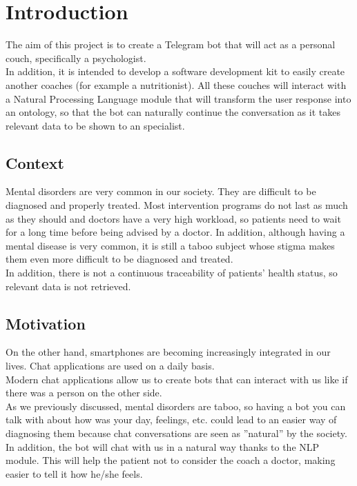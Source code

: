 \documentclass[12pt,english]{article}
\begin{document}


\thispagestyle{empty}
\newpage
\tableofcontents{}
\newpage
\listoffigures
\thispagestyle{empty}
\newpage

\section{Introduction}

The aim of this project is to create a Telegram bot that will act as a personal couch, specifically a psychologist.\\

In addition, it is intended to develop a software development kit to easily create another coaches (for example a nutritionist). All these couches will interact with a Natural Processing Language module that will transform the user response into an ontology, so that the bot can naturally continue the conversation as it takes relevant data to be shown to an specialist.

\subsection{Context}
Mental disorders are very common in our society. They are difficult to be diagnosed and properly treated. Most intervention programs do not last as much as they should and doctors have a very high workload, so patients need to wait for a long time before being advised by a doctor. In addition, although having a mental disease is very common, it is still a taboo subject whose stigma makes them even more difficult to be diagnosed and treated.\\

In addition, there is not a continuous traceability of patients' health status, so relevant data is not retrieved.



\subsection{Motivation}


On the other hand, smartphones are becoming increasingly integrated in our lives. Chat applications are used on a daily basis.\\

Modern chat applications allow us to create bots that can interact with us like if there was a person on the other side.\\

As we previously discussed, mental disorders are taboo, so having a bot you can talk with about how was your day, feelings, etc. could lead to an easier way of diagnosing them because chat conversations are seen as ''natural'' by the society. In addition, the bot will chat with us in a natural way thanks to the NLP module. This will help the patient not to consider the coach a doctor, making easier to tell it how he/she feels.
\end{document}

